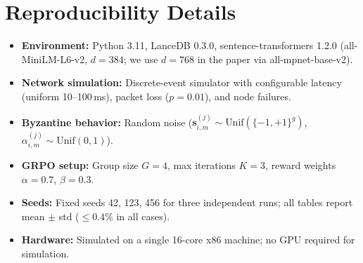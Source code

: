 \section{Reproducibility Details}

\label{app:reproducibility}

\begin{itemize}[leftmargin=1.5em]
    \item \textbf{Environment:} Python 3.11, LanceDB 0.3.0, sentence-transformers
          1.2.0 (all-MiniLM-L6-v2, $d=384$; we use $d=768$ in the paper via
          all-mpnet-base-v2).
    \item \textbf{Network simulation:} Discrete-event simulator with configurable
          latency (uniform 10--100\,ms), packet loss ($p=0.01$), and node failures.
    \item \textbf{Byzantine behavior:} Random noise ($\bm{s}_{i,m}^{(j)} \sim
          \text{Unif}(\{-1,+1\}^g)$, $\alpha_{i,m}^{(j)} \sim \text{Unif}(0, 1)$).
    \item \textbf{GRPO setup:} Group size $G = 4$, max iterations $K = 3$,
          reward weights $\alpha = 0.7$, $\beta = 0.3$.
    \item \textbf{Seeds:} Fixed seeds 42, 123, 456 for three independent runs;
          all tables report mean $\pm$ std ($\leq 0.4\%$ in all cases).
    \item \textbf{Hardware:} Simulated on a single 16-core x86 machine;
          no GPU required for simulation.
\end{itemize}

